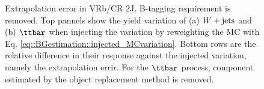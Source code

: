 \begin{figure}[h]
 \caption{Extrapolation error in VRb/CR 2J. B-tagging requirement is removed. Top pannels show the yield variation of (a) $W+\mathrm{jets}$ and (b) $\ttbar$ when injecting the variation by reweighting the MC with Eq. \ref{eq::BGestimation::injected_MCvariation}. Bottom rows are the relative difference in their response against the injected variation, namely the extrapolation errir. For the $\ttbar$ process, component estimated by the object replacement method is removed.  \label{fig::BGestimation::valid_extp_VRb2J} }
\end{figure}



